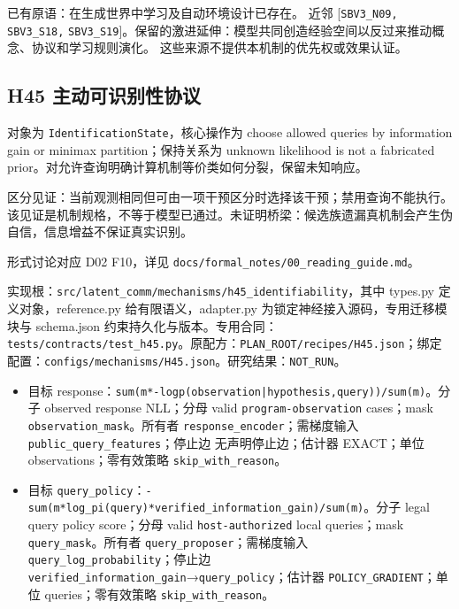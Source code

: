 \documentclass[
  10pt,
]{article}
\begin{document}
已有原语：在生成世界中学习及自动环境设计已存在。 近邻
{[}\nolinkurl{SBV3_N09,} \nolinkurl{SBV3_S18,}
\nolinkurl{SBV3_S19}{]}。保留的激进延伸：模型共同创造经验空间以反过来推动概念、协议和学习规则演化。
这些来源不提供本机制的优先权或效果认证。

\subsection{H45
主动可识别性协议}\label{h45-ux4e3bux52a8ux53efux8bc6ux522bux6027ux534fux8bae}

对象为 \nolinkurl{IdentificationState}，核心操作为 choose allowed
queries by information gain or minimax partition；保持关系为 unknown
likelihood is not a fabricated
prior。对允许查询明确计算机制等价类如何分裂，保留未知响应。

区分见证：当前观测相同但可由一项干预区分时选择该干预；禁用查询不能执行。
该见证是机制规格，不等于模型已通过。未证明桥梁：候选族遗漏真机制会产生伪自信，信息增益不保证真实识别。

形式讨论对应 D02 F10，详见
{\small\nolinkurl{docs/formal_notes/00_reading_guide.md}}。

实现根：{\small\nolinkurl{src/latent_comm/mechanisms/h45_identifiability}}，其中
types.py 定义对象，reference.py 给有限语义，adapter.py
为锁定神经接入源码，专用迁移模块与 schema.json
约束持久化与版本。专用合同：{\small\nolinkurl{tests/contracts/test_h45.py}}。原配方：{\small\nolinkurl{PLAN_ROOT/recipes/H45.json}}；绑定配置：{\small\nolinkurl{configs/mechanisms/H45.json}}。研究结果：\nolinkurl{NOT_RUN}。

\begin{itemize}
\item
  目标
  response：{\small\nolinkurl{sum(m*-log}\hspace{0.333em}\nolinkurl{p(observation|hypothesis,query))/sum(m)}}。分子
  observed response NLL；分母 valid \nolinkurl{program-observation}
  cases；mask \nolinkurl{observation_mask}。所有者
  \nolinkurl{response_encoder}；需梯度输入
  \nolinkurl{public_query_features}；停止边 无声明停止边；估计器
  EXACT；单位 observations；零有效策略 \nolinkurl{skip_with_reason}。
\item
  目标
  \nolinkurl{query_policy}：{\small\nolinkurl{-sum(m*log_pi(query)*verified_information_gain)/sum(m)}}。分子
  legal query policy score；分母 valid \nolinkurl{host-authorized} local
  queries；mask \nolinkurl{query_mask}。所有者
  \nolinkurl{query_proposer}；需梯度输入
  \nolinkurl{query_log_probability}；停止边
  \nolinkurl{verified_information_gain}→\nolinkurl{query_policy}；估计器
  \nolinkurl{POLICY_GRADIENT}；单位 queries；零有效策略
  \nolinkurl{skip_with_reason}。
\end{itemize}
\end{document}
